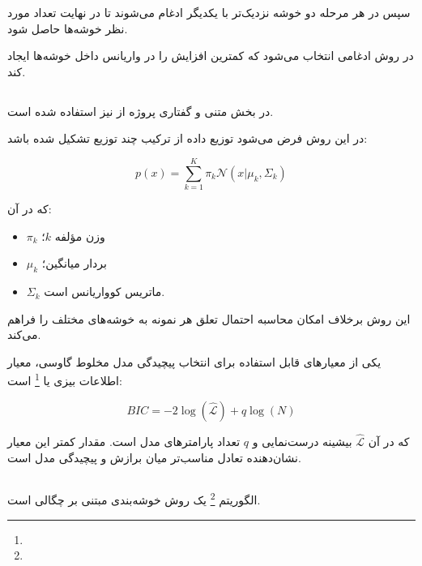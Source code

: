 \documentclass[12pt,a4paper,oneside]{report}
\begin{document}
سپس در هر مرحله دو خوشه نزدیک‌تر با یکدیگر ادغام می‌شوند تا در نهایت تعداد مورد نظر خوشه‌ها حاصل شود.

در روش
ادغامی انتخاب می‌شود که کمترین افزایش را در واریانس داخل خوشه‌ها ایجاد کند.


\subsection{}

در بخش متنی و گفتاری پروژه از
نیز استفاده شده است.

در این روش فرض می‌شود توزیع داده از ترکیب چند توزیع
تشکیل شده باشد:

\begin{equation}
p(x)
=
\sum_{k=1}^{K}
\pi_k
\mathcal{N}
(x|\mu_k,\Sigma_k)
\end{equation}

که در آن:

\begin{itemize}
	\item $\pi_k$ وزن مؤلفه $k$؛
	\item $\mu_k$ بردار میانگین؛
	\item $\Sigma_k$ ماتریس کوواریانس است.
\end{itemize}

این روش برخلاف
امکان محاسبه احتمال تعلق هر نمونه به خوشه‌های مختلف را فراهم می‌کند.

یکی از معیارهای قابل استفاده برای انتخاب پیچیدگی مدل مخلوط گاوسی، معیار اطلاعات بیزی یا
\footnote{}
است:

\begin{equation}
BIC
=
-2\log(\hat{\mathcal{L}})
+
q\log(N)
\end{equation}

که در آن $\hat{\mathcal{L}}$ بیشینه درست‌نمایی و $q$ تعداد پارامترهای مدل است. مقدار کمتر این معیار نشان‌دهنده تعادل مناسب‌تر میان برازش و پیچیدگی مدل است.


\subsection{}

الگوریتم
\footnote{}
یک روش خوشه‌بندی مبتنی بر چگالی است.
\end{document}
